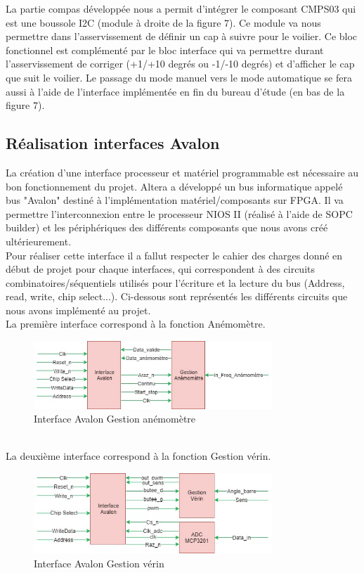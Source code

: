   La partie compas développée nous a permit d'intégrer le composant CMPS03 qui est une boussole I2C (module à droite de la figure 7). Ce module va nous permettre dans l'asservissement de définir un cap à suivre pour le voilier. Ce bloc fonctionnel est complémenté par le bloc interface qui va permettre durant l'asservissement de corriger (+1/+10 degrés ou -1/-10 degrés) et d'afficher le cap que suit le voilier. Le passage du mode manuel vers le mode automatique se fera aussi à l'aide de l'interface implémentée en fin du bureau d'étude (en bas de la figure 7). 	

  \newpage

  \subsection{Réalisation interfaces Avalon}

La création d'une interface processeur et matériel programmable est nécessaire au bon fonctionnement du projet. Altera a développé un bus informatique appelé bus "Avalon" destiné à l'implémentation matériel/composants sur FPGA. Il va permettre l'interconnexion entre le processeur NIOS II (réalisé à l'aide de SOPC builder) et les périphériques des différents composants que nous avons créé ultérieurement.\\
\newline
Pour réaliser cette interface il a fallut respecter le cahier des charges donné en début de projet pour chaque interfaces, qui correspondent à des circuits combinatoires/séquentiels utilisés pour l'écriture et la lecture du bus (Address, read, write, chip select...). Ci-dessous sont représentés les différents circuits que nous avons implémenté au projet.\\
\newline
La première interface correspond à la fonction Anémomètre.
\begin{figure}[h]
  \begin{center}
    \includegraphics[width=0.8\textwidth]{images/avalon_anemo.jpg}
    \caption{Interface Avalon Gestion anémomètre}
  \end{center}
\end{figure}\\
\newline
La deuxième interface correspond à la fonction Gestion vérin.

\begin{figure}[h]
  \begin{center}
    \includegraphics[width=0.8\textwidth]{images/avalon_verin.jpg}
    \caption{Interface Avalon Gestion vérin}
  \end{center}
\end{figure}